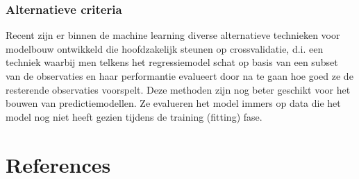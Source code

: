 \documentclass[
  dutch,
  letterpaper,
  12pt]{book}
\theoremstyle{definition}
\theoremstyle{definition}
\theoremstyle{definition}
\theoremstyle{remark}
\begin{document}
\subsection{Alternatieve criteria}\label{alternatieve-criteria}

Recent zijn er binnen de machine learning diverse alternatieve
technieken voor modelbouw ontwikkeld die hoofdzakelijk steunen op
crossvalidatie, d.i. een techniek waarbij men telkens het regressiemodel
schat op basis van een subset van de observaties en haar performantie
evalueert door na te gaan hoe goed ze de resterende observaties
voorspelt. Deze methoden zijn nog beter geschikt voor het bouwen van
predictiemodellen. Ze evalueren het model immers op data die het model
nog niet heeft gezien tijdens de training (fitting) fase.


\chapter{References}\label{references}


\backmatter

\end{document}
